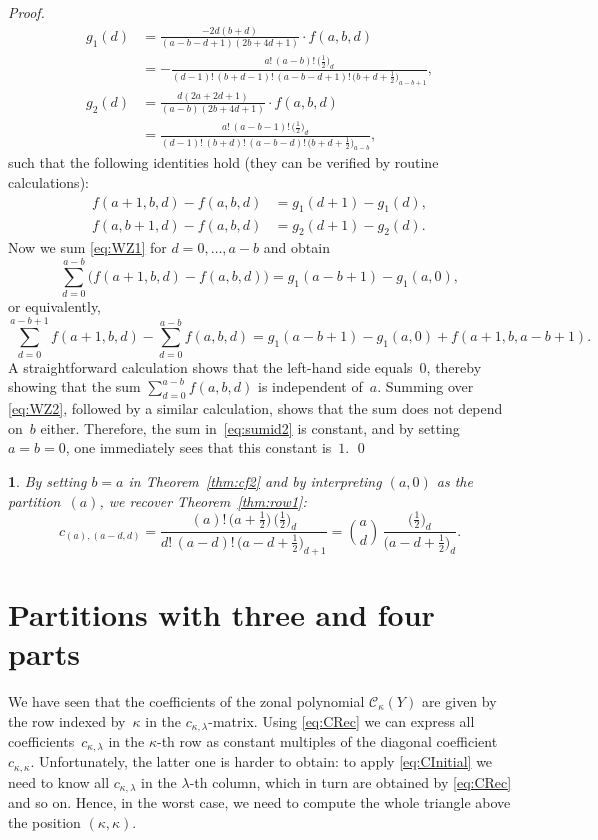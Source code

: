 \documentclass[smallextended]{svjour3}
\newtheorem{rem}[thm]{\protect\remarkname}
\providecommand{\remarkname}{Remark}
\begin{document}
\begin{proof}
\begin{align*}
    g_1(d) &= \frac{-2d(b+d)}{(a-b-d+1)(2b+4d+1)}\cdot f(a,b,d) \\
    &= -\frac{a! \, (a-b)! \, \bigl(\frac12\bigr)_{\!d}}{(d-1)! \, (b+d-1)! \, (a-b-d+1)! \, \bigl(b+d+\frac12\bigr)_{\!a-b+1}}, \\
    g_2(d) &= \frac{d(2a+2d+1)}{(a-b)(2b+4d+1)} \cdot f(a,b,d)\\
  &= \frac{a! \, (a-b-1)! \, \bigl(\frac12\bigr)_{\!d}}{(d-1)! \, (b+d)! \, (a-b-d)! \, \bigl(b+d+\frac12\bigr)_{\!a-b}},
  \end{align*}
  such that the following identities hold (they can be verified by routine
  calculations):
  \begin{align}
    f(a+1,b,d)-f(a,b,d) &= g_1(d+1) - g_1(d), \label{eq:WZ1} \\
    f(a,b+1,d)-f(a,b,d) &= g_2(d+1) - g_2(d). \label{eq:WZ2}
  \end{align}
  Now we sum \eqref{eq:WZ1} for $d=0,\dots,a-b$ and obtain
  \[
    \sum_{d=0}^{a-b}\bigl(f(a+1,b,d)-f(a,b,d)\bigr) = g_1(a-b+1) - g_1(a,0),
  \]
  or equivalently,
  \[
    \sum_{d=0}^{a-b+1}f(a+1,b,d) - \sum_{d=0}^{a-b}f(a,b,d) = g_1(a-b+1) - g_1(a,0) + f(a+1,b,a-b+1).
  \]
  A straightforward calculation shows that the left-hand side equals~$0$,
  thereby showing that the sum $\sum_{d=0}^{a-b}f(a,b,d)$ is independent
  of~$a$. Summing over \eqref{eq:WZ2}, followed by a similar calculation,
  shows that the sum does not depend on~$b$ either. Therefore, the sum
  in~\eqref{eq:sumid2} is constant, and by setting $a=b=0$, one immediately
  sees that this constant is~$1$. \qed
\end{proof}

\begin{rem}
  By setting $b=a$ in Theorem~\ref{thm:cf2} and by interpreting $(a,0)$ as the
  partition~$(a)$, we recover Theorem~\ref{thm:row1}:
  \[
    c_{(a),(a-d,d)} = 
    \frac{(a)! \, \bigl(a+\frac12\bigr) \, \bigl(\frac12\bigr)_{\!d}}
         {d! \, (a-d)! \, \bigl(a-d+\frac12\bigr)_{\!d+1}} =
    \binom{a}{d} \, \frac{\bigl(\frac12\bigr)_{\!d}}{\bigl(a-d+\frac12\bigr)_{\!d}}.
  \]
\end{rem}



\section{Partitions with three and four parts}\label{sec:3+4parts}

We have seen that the coefficients of the zonal polynomial $\mathcal{C}_\kappa(Y)$ are
given by the row indexed by~$\kappa$ in the $c_{\kappa,\lambda}$-matrix. Using
\eqref{eq:CRec} we can express all coefficients~$c_{\kappa,\lambda}$ in the
$\kappa$-th row as constant multiples of the diagonal
coefficient~$c_{\kappa,\kappa}$.  Unfortunately, the latter one is harder to
obtain: to apply \eqref{eq:CInitial} we need to know all $c_{\kappa,\lambda}$
in the $\lambda$-th column, which in turn are obtained by \eqref{eq:CRec} and
so on. Hence, in the worst case, we need to compute the whole triangle above
the position $(\kappa,\kappa)$.
\end{document}
